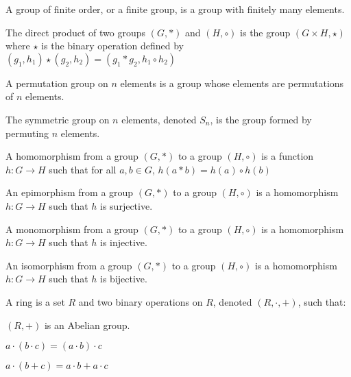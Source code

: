 \documentclass[crop=false,class=article,oneside]{standalone}
\begin{document}
        \begin{definition}
            A group of finite order, or a finite group,
            is a group with finitely many elements.
        \end{definition}
        \begin{definition}
            The direct product of two groups $(G,*)$ and
            $(H,\circ)$ is the group  $({G}\times{H},\star)$
            where $\star$ is the binary operation defined by
            $(g_{1},h_{1})\star(g_{2},h_{2})%
             =(g_{1}*g_{2},{h_{1}}\circ{h_{2}})$
        \end{definition}
        \begin{definition}
            A permutation group on $n$ elements is a
            group whose elements are permutations of
            $n$ elements.
        \end{definition}
        \begin{definition}
            The symmetric group on $n$ elements,
            denoted $S_{n}$, is the group formed by
            permuting $n$ elements.
        \end{definition}
        \begin{definition}
            A homomorphism from a group $(G,*)$ to
            a group $(H,\circ)$ is a function
            $h:{G}\rightarrow{H}$ such that for all
            ${a,b}\in{G}$, $h(a*b)={h(a)}\circ{h(b)}$
        \end{definition}
        \begin{definition}
            An epimorphism from a group $(G,*)$ to
            a group $(H,\circ)$ is a homomorphism
            $h:{G}\rightarrow{H}$ such that
            $h$ is surjective.
        \end{definition}
        \begin{definition}
            A monomorphism from a group $(G,*)$ to
            a group $(H,\circ)$ is a homomorphism
            $h:{G}\rightarrow{H}$ such that
            $h$ is injective.
        \end{definition}
        \begin{definition}
            An isomorphism from a group $(G,*)$ to
            a group $(H,\circ)$ is a homomorphism
            $h:{G}\rightarrow{H}$ such that
            $h$ is bijective.
        \end{definition}
        \begin{definition}
            A ring is a set $R$ and two binary operations
            on $R$, denoted $(R,\cdot,+)$, such that:
            \begin{enumerate}
                \begin{multicols}{3}
                \item $(R,+)$ is an Abelian group.
                \item $a\cdot({b}\cdot{c})%
                       =({a}\cdot{b})\cdot{c}$
                \item ${a}\cdot(b+c)%
                       ={a}\cdot{b}+{a}\cdot{c}$
                \end{multicols}
            \end{enumerate}
        \end{definition}
\end{document}
